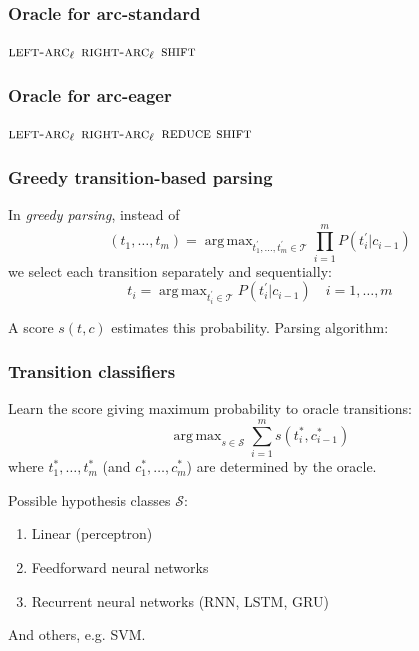 \documentclass[t]{beamer}
\DeclareMathOperator*{\argmax}{arg\,max}
\begin{document}
\begin{frame}
    \frametitle{Oracle for arc-standard}
    \begin{algorithmic}[0]
            \RETURN $\textsc{left-arc}_\ell$
            \RETURN $\textsc{right-arc}_\ell$
        \ELSE
            \RETURN $\textsc{shift}$
        \ENDIF
    \ENDWHILE
    \end{algorithmic}
\end{frame}

\begin{frame}
    \frametitle{Oracle for arc-eager}
    \begin{algorithmic}[0]
            \RETURN $\textsc{left-arc}_\ell$
            \RETURN $\textsc{right-arc}_\ell$
            \RETURN $\textsc{reduce}$
        \ELSE
            \RETURN $\textsc{shift}$
        \ENDIF
    \ENDWHILE
    \end{algorithmic}
\end{frame}

\begin{frame}
    \frametitle{Greedy transition-based parsing}
    In \textit{greedy parsing}, instead of
    \[
    (t_1,\ldots,t_m)=\argmax_{t^\prime_1,\ldots,t^\prime_m \in \mathcal{T}} \prod_{i=1}^mP(t^\prime_i|c_{i-1})
    \]
    we select each transition separately and sequentially:
    \[
    t_i = \argmax_{t^\prime_i \in \mathcal{T}} P(t^\prime_i|c_{i-1}) \quad i=1,\ldots,m
    \]
    
    \pause
    
    A score $s(t, c)$ estimates this probability. Parsing algorithm:
    
    \begin{algorithmic}[0]
        \STATE{$c\leftarrow\Big(\argmax_{t\in\mathcal{T}}s(t,c)\Big)(c)$}
    \ENDWHILE
    \end{algorithmic}
\end{frame}

\begin{frame}
    \frametitle{Transition classifiers}
    Learn the score giving maximum probability to oracle transitions:
    \[
    \argmax_{s\in\mathcal{S}}\sum_{i=1}^ms(t^*_i,c^*_{i-1})
    \]
    where $t^*_1,\ldots,t^*_m$ (and $c^*_1,\ldots,c^*_m$) are determined by the oracle.
    
    \pause\vfill
    
    Possible hypothesis classes $\mathcal{S}$:
    \begin{enumerate}
    \item Linear (perceptron)
    \item Feedforward neural networks
    \item Recurrent neural networks (RNN, LSTM, GRU)
    \end{enumerate}
    And others, e.g. SVM.
\end{frame}
\end{document}
